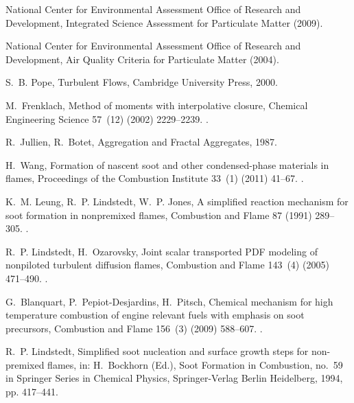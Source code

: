 \documentclass[preprint,letterpaper]{elsarticle}
\begin{document}
\begin{thebibliography}{00}

{National Center for Environmental Assessment Office of Research and
Development}, {Integrated Science Assessment for Particulate Matter} (2009).

{National Center for Environmental Assessment Office of Research and
Development}, {Air Quality Criteria for Particulate Matter} (2004).

S.~B. Pope, {Turbulent Flows}, {Cambridge University Press}, 2000.

M.~Frenklach, {Method of moments with interpolative closure}, {Chemical
Engineering Science} 57~(12) (2002) 2229--2239.
\newblock \href {http://dx.doi.org/10.1016/S0009-2509(02)00113-6}
  {}.

R.~Jullien, R.~Botet, {Aggregation and Fractal Aggregates}, 1987.

H.~Wang, {Formation of nascent soot and other condensed-phase materials in
flames}, {Proceedings of the Combustion Institute} 33~(1) (2011) 41--67.
\newblock \href {http://dx.doi.org/10.1016/j.proci.2010.09.009}
  {}.

K.~M. Leung, R.~P. Lindstedt, W.~P. Jones, {A simplified reaction mechanism for
soot formation in nonpremixed flames}, {Combustion and Flame} 87 (1991)
289--305.
\newblock \href {http://dx.doi.org/10.1016/0010-2180(91)90114-q}
  {}.

R.~P. Lindstedt, H.~Ozarovsky, {Joint scalar transported {PDF} modeling of
nonpiloted turbulent diffusion flames}, {Combustion and Flame} 143~(4) (2005)
471--490.
\newblock \href {http://dx.doi.org/10.1016/j.combustflame.2005.08.030}
  {}.

G.~Blanquart, P.~Pepiot-Desjardins, H.~Pitsch, {Chemical mechanism for high
temperature combustion of engine relevant fuels with emphasis on soot
precursors}, {Combustion and Flame} 156~(3) (2009) 588--607.
\newblock \href {http://dx.doi.org/10.1016/j.combustflame.2008.12.007}
  {}.

R.~P. Lindstedt, {Simplified soot nucleation and surface growth steps for
non-premixed flames}, in: H.~Bockhorn (Ed.), {Soot Formation in Combustion},
no.~59 in {Springer Series in Chemical Physics}, {Springer-Verlag Berlin
Heidelberg}, 1994, pp. 417--441.


\end{thebibliography}
\end{document}
